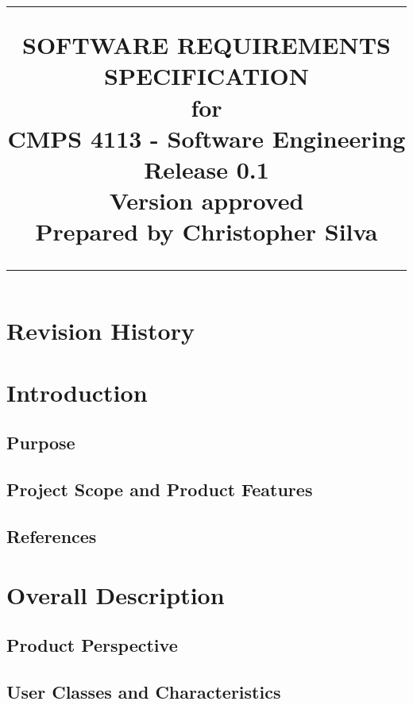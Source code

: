 \documentclass{scrreprt}
\title{%
	\flushright
	\rule{16cm}{5pt}\vskip1cm
	\Huge{SOFTWARE REQUIREMENTS\\ SPECIFICATION}\\
	\vspace{2cm}
	for\\
	\vspace{2cm}
	CMPS 4113 - Software Engineering\\
	\vspace{2cm}
	\LARGE{Release 0.1\\}
	\vspace{2cm}
	\LARGE{Version \myversion approved\\}
	\vspace{2cm}
	Prepared by Christopher Silva\\
	\vfill
	\rule{16cm}{5pt}
}
\date{}
\begin{document}
	\maketitle
	\tableofcontents
	\chapter*{Revision History}
	\chapter{Introduction}
	\section{Purpose}
	\section{Project Scope and Product Features}
	\section{References}
	\chapter{Overall Description}
	\section{Product Perspective}
	\section{User Classes and Characteristics}
\end{document}
